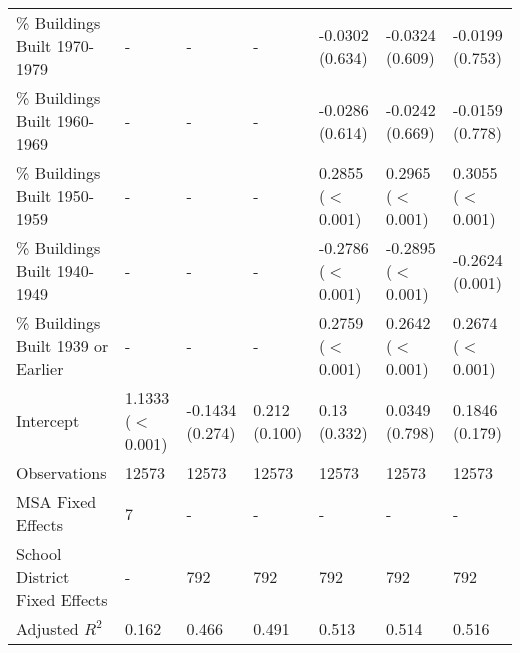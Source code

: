 \begin{landscape}
\begin{table}[h]
\begin{tabular}{l|llllll}
\% Buildings Built 1970-1979 &- & - & - & -0.0302 (0.634) & -0.0324 (0.609) & -0.0199 (0.753) \\
\% Buildings Built 1960-1969 &- & - & - & -0.0286 (0.614) & -0.0242 (0.669) & -0.0159 (0.778) \\
\% Buildings Built 1950-1959 &- & - & - & 0.2855 ($<$0.001) & 0.2965 ($<$0.001) & 0.3055 ($<$0.001) \\
\% Buildings Built 1940-1949 &- & - & - & -0.2786 ($<$0.001) & -0.2895 ($<$0.001) & -0.2624 (0.001) \\
\% Buildings Built 1939 or Earlier &- & - & - & 0.2759 ($<$0.001) & 0.2642 ($<$0.001) & 0.2674 ($<$0.001) \\
Intercept &1.1333 ($<$0.001) & -0.1434 (0.274) & 0.212 (0.100) & 0.13 (0.332) & 0.0349 (0.798) & 0.1846 (0.179) \\
Observations &12573 & 12573 & 12573 & 12573 & 12573 & 12573 \\
MSA Fixed Effects &7 & - & - & - & - & - \\
School District Fixed Effects &- & 792 & 792 & 792 & 792 & 792 \\
Adjusted $R^2$ &0.162 & 0.466 & 0.491 & 0.513 & 0.514 & 0.516 \\\hline
\end{tabular}
\end{table}
\newpage
\end{landscape}
\restoregeometry
